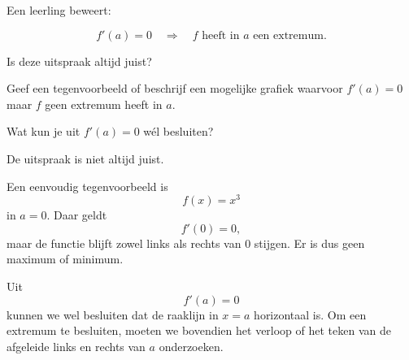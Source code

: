 \documentclass{ximera}
\begin{document}
\begin{oefening}{\oefB\ESS}

Een leerling beweert:

\[
f'(a)=0
\quad\Longrightarrow\quad
f \text{ heeft in }a\text{ een extremum}.
\]

\begin{question}
Is deze uitspraak altijd juist?
\end{question}

\begin{question}
Geef een tegenvoorbeeld of beschrijf een mogelijke grafiek waarvoor
$f'(a)=0$ maar $f$ geen extremum heeft in $a$.
\end{question}

\begin{question}
Wat kun je uit $f'(a)=0$ wél besluiten?
\end{question}

\begin{oplossing}

De uitspraak is niet altijd juist.

Een eenvoudig tegenvoorbeeld is
\[
f(x)=x^3
\]
in $a=0$. Daar geldt
\[
f'(0)=0,
\]
maar de functie blijft zowel links als rechts van $0$ stijgen. Er is dus
geen maximum of minimum.

Uit
\[
f'(a)=0
\]
kunnen we wel besluiten dat de raaklijn in $x=a$ horizontaal is.
Om een extremum te besluiten, moeten we bovendien het verloop of het
teken van de afgeleide links en rechts van $a$ onderzoeken.

\end{oplossing}

\end{oefening}






\end{document}
